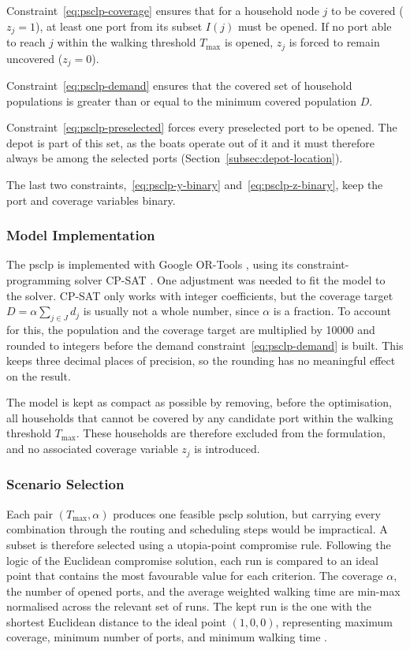\documentclass[12pt]{article}
\begin{document}
Constraint~\eqref{eq:psclp-coverage} ensures that for a household node \(j\) to be covered (\(z_j = 1\)), at least one port from its subset \(I(j)\) must be opened. If no port able to reach \(j\) within the walking threshold \(T_{\max}\) is opened, \(z_j\) is forced to remain uncovered (\(z_j = 0\)).

Constraint~\eqref{eq:psclp-demand} ensures that the covered set of household populations is greater than or equal to the minimum covered population \(D\).

Constraint~\eqref{eq:psclp-preselected} forces every preselected port to be opened. The depot is part of this set, as the boats operate out of it and it must therefore always be among the selected ports (Section~\ref{subsec:depot-location}).

The last two constraints,~\eqref{eq:psclp-y-binary} and~\eqref{eq:psclp-z-binary}, keep the port and coverage variables binary.

\subsubsection{Model Implementation}
\label{subsubsec:psclp-implementation}

The \ac{psclp} is implemented with Google OR-Tools \parencite{ortools}, using its constraint-programming solver CP-SAT \parencite{cpsat}. One adjustment was needed to fit the model to the solver. CP-SAT only works with integer coefficients, but the coverage target \(D = \alpha \sum_{j \in J} d_j\) is usually not a whole number, since \(\alpha\) is a fraction. To account for this, the population and the coverage target are multiplied by \num{10000} and rounded to integers before the demand constraint~\eqref{eq:psclp-demand} is built. This keeps three decimal places of precision, so the rounding has no meaningful effect on the result.

The model is kept as compact as possible by removing, before the optimisation, all households that cannot be covered by any candidate port within the walking threshold \(T_{\max}\). These households are therefore excluded from the formulation, and no associated coverage variable \(z_j\) is introduced.

\subsubsection{Scenario Selection}
\label{subsubsec:scenario-selection}

Each pair \((T_{\max}, \alpha)\) produces one feasible \ac{psclp} solution, but carrying every combination through the routing and scheduling steps would be impractical. A subset is therefore selected using a utopia-point compromise rule. Following the logic of the Euclidean compromise solution, each run is compared to an ideal point that contains the most favourable value for each criterion. The coverage \(\alpha\), the number of opened ports, and the average weighted walking time are min-max normalised across the relevant set of runs. The kept run is the one with the shortest Euclidean distance to the ideal point \((1, 0, 0)\), representing maximum coverage, minimum number of ports, and minimum walking time \parencite{voorneveld2011euclidean}.
\end{document}

